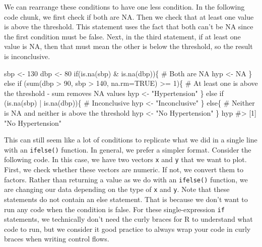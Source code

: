 \documentclass[
  letterpaper,
]{latex/krantz}
\makeatletter
\newenvironment{Shaded}{\begin{snugshade}}{\end{snugshade}}
\newcommand{\AttributeTok}[1]{\textcolor[rgb]{0.40,0.45,0.13}{#1}}
\newcommand{\CommentTok}[1]{\textcolor[rgb]{0.37,0.37,0.37}{#1}}
\newcommand{\ConstantTok}[1]{\textcolor[rgb]{0.56,0.35,0.01}{#1}}
\newcommand{\ControlFlowTok}[1]{\textcolor[rgb]{0.00,0.23,0.31}{#1}}
\newcommand{\DecValTok}[1]{\textcolor[rgb]{0.68,0.00,0.00}{#1}}
\newcommand{\FunctionTok}[1]{\textcolor[rgb]{0.28,0.35,0.67}{#1}}
\newcommand{\NormalTok}[1]{\textcolor[rgb]{0.00,0.23,0.31}{#1}}
\newcommand{\OtherTok}[1]{\textcolor[rgb]{0.00,0.23,0.31}{#1}}
\newcommand{\SpecialCharTok}[1]{\textcolor[rgb]{0.37,0.37,0.37}{#1}}
\newcommand{\StringTok}[1]{\textcolor[rgb]{0.13,0.47,0.30}{#1}}
\newenvironment{kframe}{%
\medskip{}
\setlength{\fboxsep}{.8em}
 \def\at@end@of@kframe{}%
 \ifinner\ifhmode%
  \def\at@end@of@kframe{\end{minipage}}%
  \begin{minipage}{\columnwidth}%
 \fi\fi%
 \def\FrameCommand##1{\hskip\@totalleftmargin \hskip-\fboxsep
 \colorbox{shadecolor}{##1}\hskip-\fboxsep
     \hskip-\linewidth \hskip-\@totalleftmargin \hskip\columnwidth}%
 \MakeFramed {\advance\hsize-\width
   \@totalleftmargin\z@ \linewidth\hsize
   \@setminipage}}%
 {\par\unskip\endMakeFramed%
 \at@end@of@kframe}
\renewenvironment{Shaded}{\begin{kframe}}{\end{kframe}}
\makeatother
\begin{document}
We can rearrange these conditions to have one less condition. In the
following code chunk, we first check if both are NA. Then we check that
at least one value is above the threshold. This statement uses the fact
that both can't be NA since the first condition must be false. Next, in
the third statement, if at least one value is NA, then that must mean
the other is below the threshold, so the result is inconclusive.

\begin{Shaded}
\begin{Highlighting}[]
\NormalTok{sbp }\OtherTok{\textless{}{-}} \DecValTok{130}
\NormalTok{dbp }\OtherTok{\textless{}{-}} \DecValTok{80}
\ControlFlowTok{if}\NormalTok{(}\FunctionTok{is.na}\NormalTok{(sbp) }\SpecialCharTok{\&} \FunctionTok{is.na}\NormalTok{(dbp))\{}
  \CommentTok{\# Both are NA}
\NormalTok{  hyp }\OtherTok{\textless{}{-}} \ConstantTok{NA}
\NormalTok{\} }\ControlFlowTok{else} \ControlFlowTok{if}\NormalTok{ (}\FunctionTok{sum}\NormalTok{(dbp }\SpecialCharTok{\textgreater{}} \DecValTok{90}\NormalTok{, sbp }\SpecialCharTok{\textgreater{}} \DecValTok{140}\NormalTok{, }\AttributeTok{na.rm=}\ConstantTok{TRUE}\NormalTok{) }\SpecialCharTok{\textgreater{}=} \DecValTok{1}\NormalTok{)\{}
  \CommentTok{\# At least one is above the threshold {-} sum removes NA values}
\NormalTok{  hyp }\OtherTok{\textless{}{-}} \StringTok{"Hypertension"}
\NormalTok{\} }\ControlFlowTok{else} \ControlFlowTok{if}\NormalTok{ (}\FunctionTok{is.na}\NormalTok{(sbp) }\SpecialCharTok{|} \FunctionTok{is.na}\NormalTok{(dbp))\{}
  \CommentTok{\# Inconclusive}
\NormalTok{  hyp }\OtherTok{\textless{}{-}} \StringTok{"Inconclusive"}
\NormalTok{\} }\ControlFlowTok{else}\NormalTok{\{}
  \CommentTok{\# Neither is NA and neither is above the threshold}
\NormalTok{  hyp }\OtherTok{\textless{}{-}} \StringTok{"No Hypertension"}
\NormalTok{\}}
\NormalTok{hyp}
\CommentTok{\#\textgreater{} [1] "No Hypertension"}
\end{Highlighting}
\end{Shaded}

This can still seem like a lot of conditions to replicate what we did in
a single line with an \texttt{ifelse()} function. In general, we prefer
a simpler format. Consider the following code. In this case, we have two
vectors \texttt{x} and \texttt{y} that we want to plot. First, we check
whether these vectors are numeric. If not, we convert them to factors.
Rather than returning a value as we do with an \texttt{ifelse()}
function, we are changing our data depending on the type of \texttt{x}
and \texttt{y}. Note that these statements do not contain an else
statement. That is because we don't want to run any code when the
condition is false. For these single-expression \texttt{if} statements,
we technically don't need the curly braces for R to understand what code
to run, but we consider it good practice to always wrap your code in
curly braces when writing control flows.
\end{document}
